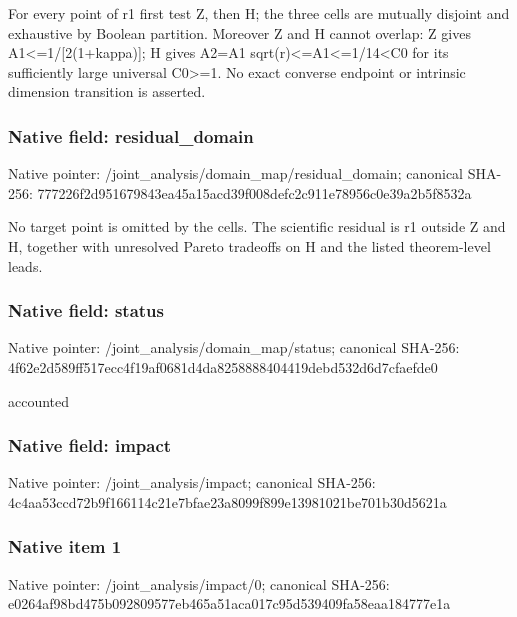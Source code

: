 \documentclass[10pt,a4paper]{article}
\begin{document}
\begingroup\raggedright\sloppy For every point of r1 first test Z,\allowbreak{} then H;\allowbreak{} the three cells are mutually disjoint and exhaustive by Boolean partition. Moreover Z and H cannot overlap:\allowbreak{} Z gives A1<=\allowbreak{}1/\allowbreak{}[2(1+kappa)];\allowbreak{} H gives A2=\allowbreak{}A1 sqrt(r)<=\allowbreak{}A1<=\allowbreak{}1/\allowbreak{}14<C0 for its sufficiently large universal C0>=\allowbreak{}1. No exact converse endpoint or intrinsic dimension transition is asserted.\par\endgroup

\subsubsection{Native field: residual\_\allowbreak{}domain}
Native pointer: /joint\_\allowbreak{}analysis/domain\_\allowbreak{}map/residual\_\allowbreak{}domain; canonical SHA-256: 777226f2d951679843ea45a15acd39f008defc2c911e78956c0e39a2b5f8532a

\begingroup\raggedright\sloppy No target point is omitted by the cells. The scientific residual is r1 outside Z and H,\allowbreak{} together with unresolved Pareto tradeoffs on H and the listed theorem-level leads.\par\endgroup

\subsubsection{Native field: status}
Native pointer: /joint\_\allowbreak{}analysis/domain\_\allowbreak{}map/status; canonical SHA-256: 4f62e2d589ff517ecc4f19af0681d4da8258888404419debd532d6d7cfaefde0

\begingroup\raggedright\sloppy accounted\par\endgroup

\subsubsection{Native field: impact}
Native pointer: /joint\_\allowbreak{}analysis/impact; canonical SHA-256: 4c4aa53ccd72b9f166114c21e7bfae23a8099f899e13981021be701b30d5621a

\subsubsection{Native item 1}
Native pointer: /joint\_\allowbreak{}analysis/impact/0; canonical SHA-256: e0264af98bd475b092809577eb465a51aca017c95d539409fa58eaa184777e1a
\end{document}
